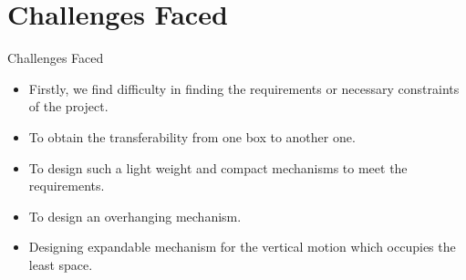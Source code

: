 \documentclass[12pt, a4paper]{beamer}
\begin{document}

\section{Challenges Faced}
\begin{frame}{Challenges Faced}
	\begin{itemize}
		\item Firstly, we find difficulty in finding the requirements or necessary constraints of the project.
		\item To obtain the transferability from one box to another one.
		\item To design such a light weight and compact mechanisms to meet the requirements.
		\item To design an overhanging mechanism.
		\item Designing expandable mechanism for the vertical motion which occupies the least space.
	\end{itemize}
\end{frame}
\end{document}

